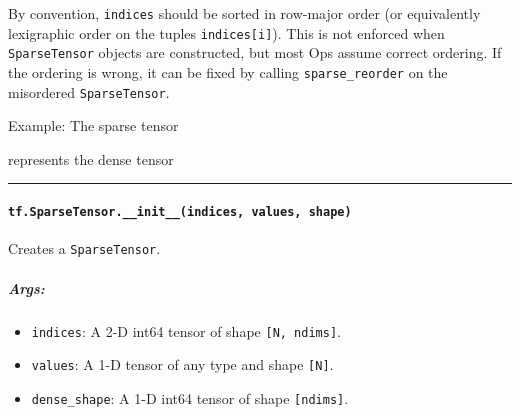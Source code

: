 By convention, \texttt{indices} should be sorted in row-major order (or
equivalently lexigraphic order on the tuples \texttt{indices{[}i{]}}).
This is not enforced when \texttt{SparseTensor} objects are constructed,
but most Ops assume correct ordering. If the ordering is wrong, it can
be fixed by calling \texttt{sparse\_reorder} on the misordered
\texttt{SparseTensor}.

Example: The sparse tensor

\begin{Shaded}
\begin{Highlighting}[]
  \OperatorTok{=}\NormalTok{[}\NormalTok{, }\NormalTok{], indices}\OperatorTok{=}\NormalTok{[[}\NormalTok{, }\NormalTok{], [}\NormalTok{, }\NormalTok{]], shape}\OperatorTok{=}\NormalTok{[}\NormalTok{, }\NormalTok{])}
\end{Highlighting}
\end{Shaded}

represents the dense tensor

\begin{Shaded}
\begin{Highlighting}[]
  \NormalTok{[[}\NormalTok{, }\NormalTok{, }\NormalTok{, }\NormalTok{]}
   \NormalTok{[}\NormalTok{, }\NormalTok{, }\NormalTok{, }\NormalTok{]}
   \NormalTok{[}\NormalTok{, }\NormalTok{, }\NormalTok{, }\NormalTok{]]}
\end{Highlighting}
\end{Shaded}

\begin{center}\rule{0.5\linewidth}{\linethickness}\end{center}

\paragraph{\texorpdfstring{\texttt{tf.SparseTensor.\_\_init\_\_(indices,\ values,\ shape)}
}{tf.SparseTensor.\_\_init\_\_(indices, values, shape) }}\label{tf.sparsetensor.ux5fux5finitux5fux5findices-values-shape}

Creates a \texttt{SparseTensor}.

\subparagraph{Args: }\label{args}

\begin{itemize}
\tightlist
\item
  \texttt{indices}: A 2-D int64 tensor of shape
  \texttt{{[}N,\ ndims{]}}.
\item
  \texttt{values}: A 1-D tensor of any type and shape \texttt{{[}N{]}}.
\item
  \texttt{dense\_shape}: A 1-D int64 tensor of shape
  \texttt{{[}ndims{]}}.
\end{itemize}

